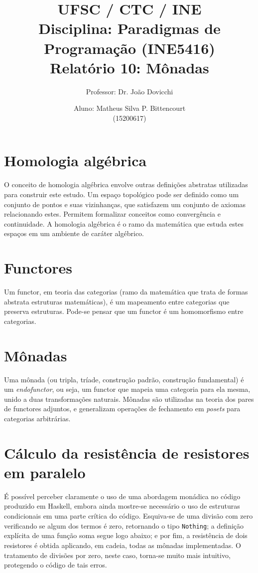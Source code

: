 \documentclass[a4paper,twocolumn,10pt]{article}
\begin{document}
\title{
	\large \rm UFSC / CTC / INE\\
	\large \rm Disciplina: Paradigmas de Programação (INE5416)\\
	\Large \bf Relatório 10: Mônadas
}

\author{
	Professor: Dr. João Dovicchi\\
	\and
	Aluno: Matheus Silva P. Bittencourt\\(15200617)
}

\maketitle

\section{Homologia algébrica}

O conceito de homologia algébrica envolve outras definições abstratas
utilizadas para construir este estudo. Um espaço topológico pode ser definido
como um conjunto de pontos e suas vizinhanças, que satisfazem um conjunto de
axiomas relacionando estes. Permitem formalizar conceitos como convergência e
continuidade. A homologia algébrica é o ramo da matemática que estuda estes
espaços em um ambiente de caráter algébrico.

\section{Functores}

Um functor, em teoria das categorias (ramo da matemática que trata de formas
abstrata estruturas matemáticas), é um mapeamento entre categorias que preserva
estruturas. Pode-se pensar que um functor é um homomorfismo entre categorias.

\section{Mônadas}

Uma mônada (ou tripla, tríade, construção padrão, construção fundamental) é um
\textit{endofunctor}, ou seja, um functor que mapeia uma categoria para ela
mesma, unido a duas transformações naturais. Mônadas são utilizadas na teoria
dos pares de functores adjuntos, e generalizam operações de fechamento em
\textit{posets} para categorias arbitrárias.

\section{Cálculo da resistência de resistores em paralelo}

É possível perceber claramente o uso de uma abordagem monádica no código
produzido em Haskell, embora ainda mostre-se necessário o uso de estruturas
condicionais em uma parte crítica do código. Esquiva-se de uma divisão com zero
verificando se algum dos termos é zero, retornando o tipo \texttt{Nothing}; a
definição explícita de uma função soma segue logo abaixo; e por fim, a
resistência de dois resistores é obtida aplicando, em cadeia, todas as mônadas
implementadas. O tratamento de divisões por zero, neste caso, torna-se muito
mais intuitivo, protegendo o código de tais erros.
\end{document}
